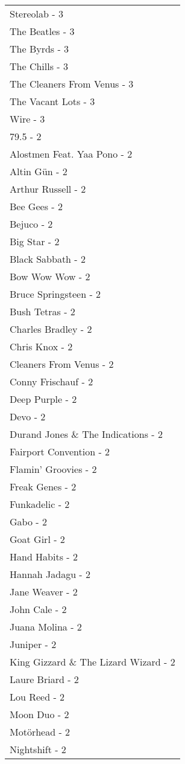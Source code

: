 \documentclass[
]{article}
\begin{document}
\begin{longtable}{l}
Stereolab - 3 \\ 
The Beatles - 3 \\ 
The Byrds - 3 \\ 
The Chills - 3 \\ 
The Cleaners From Venus - 3 \\ 
The Vacant Lots - 3 \\ 
Wire - 3 \\ 
79.5 - 2 \\ 
Alostmen Feat. Yaa Pono - 2 \\ 
Altin Gün - 2 \\ 
Arthur Russell - 2 \\ 
Bee Gees - 2 \\ 
Bejuco - 2 \\ 
Big Star - 2 \\ 
Black Sabbath - 2 \\ 
Bow Wow Wow - 2 \\ 
Bruce Springsteen - 2 \\ 
Bush Tetras - 2 \\ 
Charles Bradley - 2 \\ 
Chris Knox - 2 \\ 
Cleaners From Venus - 2 \\ 
Conny Frischauf - 2 \\ 
Deep Purple - 2 \\ 
Devo - 2 \\ 
Durand Jones \& The Indications - 2 \\ 
Fairport Convention - 2 \\ 
Flamin' Groovies - 2 \\ 
Freak Genes - 2 \\ 
Funkadelic - 2 \\ 
Gabo - 2 \\ 
Goat Girl - 2 \\ 
Hand Habits - 2 \\ 
Hannah Jadagu - 2 \\ 
Jane Weaver - 2 \\ 
John Cale - 2 \\ 
Juana Molina - 2 \\ 
Juniper - 2 \\ 
King Gizzard \& The Lizard Wizard - 2 \\ 
Laure Briard - 2 \\ 
Lou Reed - 2 \\ 
Moon Duo - 2 \\ 
Motörhead - 2 \\ 
Nightshift - 2 \\ 

\end{longtable}
\end{document}
